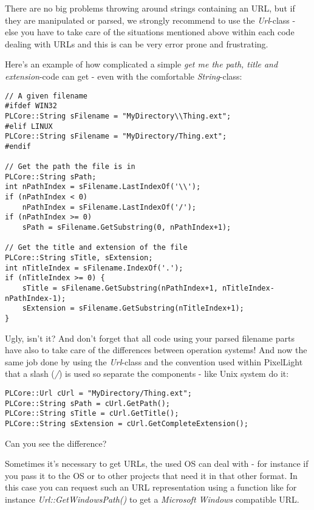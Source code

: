 There are no big problems throwing around strings containing an \ac{URL}, but if they are manipulated or parsed, we strongly recommend to use the \emph{Url}-class - else you have to take care of the situations mentioned above within each code dealing with \ac{URL}s and this is can be very error prone and frustrating.

Here's an example of how complicated a simple \emph{get me the path, title and extension}-code can get - even with the comfortable \emph{String}-class:

\begin{lstlisting}[caption=File path\, title and extension without using the Url-class]
// A given filename
#ifdef WIN32
PLCore::String sFilename = "MyDirectory\\Thing.ext";
#elif LINUX
PLCore::String sFilename = "MyDirectory/Thing.ext";
#endif

// Get the path the file is in
PLCore::String sPath;
int nPathIndex = sFilename.LastIndexOf('\\');
if (nPathIndex < 0)
	nPathIndex = sFilename.LastIndexOf('/');
if (nPathIndex >= 0)
	sPath = sFilename.GetSubstring(0, nPathIndex+1);

// Get the title and extension of the file
PLCore::String sTitle, sExtension;
int nTitleIndex = sFilename.IndexOf('.');
if (nTitleIndex >= 0) {
	sTitle = sFilename.GetSubstring(nPathIndex+1, nTitleIndex-nPathIndex-1);
	sExtension = sFilename.GetSubstring(nTitleIndex+1);
}
\end{lstlisting}

Ugly, isn't it? And don't forget that all code using your parsed filename parts have also to take care of the differences between operation systems! And now the same job done by using the \emph{Url}-class and the convention used within PixelLight that a slash (\emph{/}) is used so separate the components - like Unix system do it:

\begin{lstlisting}[caption=File path\, title and extension using the Url class]
PLCore::Url cUrl = "MyDirectory/Thing.ext";
PLCore::String sPath = cUrl.GetPath();
PLCore::String sTitle = cUrl.GetTitle();
PLCore::String sExtension = cUrl.GetCompleteExtension();
\end{lstlisting}

Can you see the difference?

Sometimes it's necessary to get \ac{URL}s, the used \ac{OS} can deal with - for instance if you pass it to the \ac{OS} or to other projects that need it in that other format. In this case you can request such an \ac{URL} representation using a function like for instance \emph{Url::GetWindowsPath()} to get a \emph{Microsoft Windows} compatible \ac{URL}.

